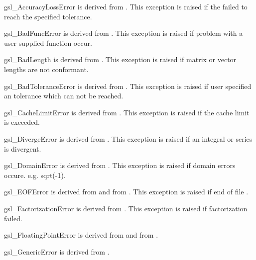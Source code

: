 \begin{excclassdesc}{gsl_AccuracyLossError}{}
is derived from   .
This exception is raised if the failed to reach the specified tolerance.
\end{excclassdesc}
\begin{excclassdesc}{gsl_BadFuncError}{}
is derived from   .
This exception is raised if problem with a user-supplied function occur.
\end{excclassdesc}
\begin{excclassdesc}{gsl_BadLength}{}
is derived from   .
This exception is raised if  matrix or  vector lengths are not conformant.
\end{excclassdesc}
\begin{excclassdesc}{gsl_BadToleranceError}{}
is derived from   .
This exception is raised if user specified an tolerance which can not be reached.
\end{excclassdesc}
\begin{excclassdesc}{gsl_CacheLimitError}{}
is derived from   .
This exception is raised if the    cache limit is exceeded.
\end{excclassdesc}
\begin{excclassdesc}{gsl_DivergeError}{}
is derived from   .
This exception is raised if an   integral or series is divergent.
\end{excclassdesc}
\begin{excclassdesc}{gsl_DomainError}{}
is derived from   .
This exception is raised if    domain errors occure. e.g. sqrt(-1).
\end{excclassdesc}
\begin{excclassdesc}{gsl_EOFError}{}
is derived from   and from   .
This exception is raised if 
    end of file
     .
\end{excclassdesc}
\begin{excclassdesc}{gsl_FactorizationError}{}
is derived from   .
This exception is raised if     factorization failed.
\end{excclassdesc}
\begin{excclassdesc}{gsl_FloatingPointError}{}
is derived from   and from   .
\end{excclassdesc}
\begin{excclassdesc}{gsl_GenericError}{}
is derived from   .
\end{excclassdesc}
